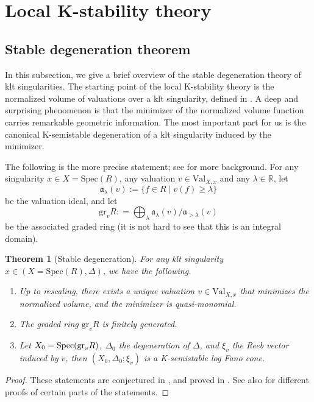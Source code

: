 \documentclass[12pt]{amsart}
\newtheorem{thm}[prop]{Theorem}
\theoremstyle{definition}
\newcommand{\bR}{\mathbb{R}}
\newcommand{\fa}{\mathfrak{a}}
\newcommand{\Spec}{\mathrm{Spec}}
\newcommand{\Val}{\mathrm{Val}}
\newcommand{\gr}{\mathrm{gr}}
\numberwithin{equation}{section}
\begin{document}


\section{Local K-stability theory}\label{s-stability theory}

\subsection{Stable degeneration theorem}

In this subsection, we give a brief overview of the stable degeneration theory of klt singularities. The starting point of the local K-stability theory is the normalized volume of valuations over a klt singularity, defined in \cite{Li-nv}. A deep and surprising phenomenon is that the minimizer of the normalized volume function carries remarkable geometric information. The most important part for us is the canonical K-semistable degeneration of a klt singularity induced by the minimizer. 

The following is the more precise statement; see \cites{LLX-nvsurvey, Z-survey-klt-stab, Xu-book} for more background. For any singularity $x\in X=\Spec(R)$, any valuation $v\in \Val_{X,x}$ and any $\lambda\in \bR$, let $$\fa_{\lambda}(v):=\{f\in R\mid v(f)\geq \lambda\}$$ be the valuation ideal, and let $$\gr_v R: = \bigoplus_{\lambda} \fa_{\lambda}(v)/\fa_{>\lambda}(v)$$ be the associated graded ring (it is not hard to see that this is an integral domain).

\begin{thm}[Stable degeneration]\label{thm-SDC}  
For any klt singularity $x\in (X=\Spec(R),\Delta)$, we have the following.
\begin{enumerate}
\item Up to rescaling, there exists a unique valuation $v\in \Val_{X,x}$ that minimizes the normalized volume, and the minimizer is quasi-monomial. 
\item The graded ring ${\gr}_v R$ is finitely generated.
\item Let $X_0={\rm Spec}({\gr}_v R)$, $\Delta_0$ the degeneration of $\Delta$, and $\xi_v$ the Reeb vector induced by $v$, then $(X_0,\Delta_0;\xi_v)$ is a K-semistable log Fano cone.
\end{enumerate}
\end{thm}

\begin{proof}
These statements are conjectured in \cite{Li-nv}, and proved in \cite{Blu-existence, LX-higher-rank, Xu-quasimonomial, XZ-uniqueness, XZ-SDC}. See also \cite{BLQ-convexity,Che-HRFG} for different proofs of certain parts of the statements. 
\end{proof}
\end{document}
